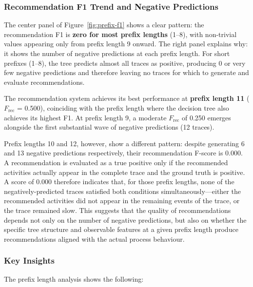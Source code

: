 \documentclass{article}
\begin{document}
\subsubsection{Recommendation F1 Trend and Negative Predictions}

The center panel of Figure~\ref{fig:prefix-f1} shows a clear pattern: the recommendation F1 is \textbf{zero for most prefix lengths} (1--8), with non-trivial values appearing only from prefix length 9 onward. The right panel explains why: it shows the number of negative predictions at each prefix length. For short prefixes (1--8), the tree predicts almost all traces as positive, producing 0 or very few negative predictions and therefore leaving no traces for which to generate and evaluate recommendations.

\medskip
\noindent
The recommendation system achieves its best performance at \textbf{prefix length 11} ($F_{\text{rec}}$ = 0.500), coinciding with the prefix length where the decision tree also achieves its highest F1. At prefix length 9, a moderate $F_{\text{rec}}$ of 0.250 emerges alongside the first substantial wave of negative predictions (12 traces).

\medskip
\noindent
Prefix lengths 10 and 12, however, show a different pattern: despite generating 6 and 13 negative predictions respectively, their recommendation F-score is 0.000. A recommendation is evaluated as a true positive only if the recommended activities actually appear in the complete trace and the ground truth is positive. A score of 0.000 therefore indicates that, for those prefix lengths, none of the negatively-predicted traces satisfied both conditions simultaneously—either the recommended activities did not appear in the remaining events of the trace, or the trace remained slow. This suggests that the quality of recommendations depends not only on the number of negative predictions, but also on whether the specific tree structure and observable features at a given prefix length produce recommendations aligned with the actual process behaviour.

\subsubsection{Key Insights}

The prefix length analysis shows the following:
\end{document}
